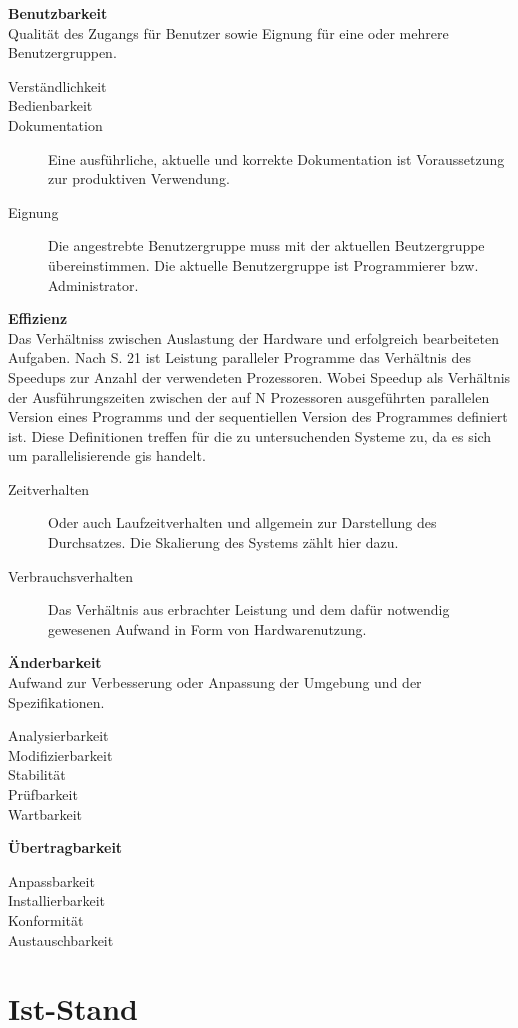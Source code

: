 \textbf{Benutzbarkeit}\\
Qualität des Zugangs für Benutzer sowie Eignung für eine oder mehrere Benutzergruppen.
\begin{description}
\item[Verständlichkeit] 
\item[Bedienbarkeit] 
\item[Dokumentation] Eine ausführliche, aktuelle und korrekte Dokumentation ist Voraussetzung zur produktiven Verwendung.
\item[Eignung] Die angestrebte Benutzergruppe muss mit der aktuellen Beutzergruppe übereinstimmen. Die aktuelle Benutzergruppe ist Programmierer bzw. Administrator.
\end{description}

\textbf{Effizienz}\\
Das Verhältniss zwischen Auslastung der Hardware und erfolgreich bearbeiteten Aufgaben. Nach \cite{book:Leistungsanalyse} S. 21 ist Leistung paralleler Programme das Verhältnis des Speedups zur Anzahl der verwendeten Prozessoren. Wobei Speedup als Verhältnis der Ausführungszeiten zwischen der auf N Prozessoren ausgeführten parallelen Version eines Programms und der sequentiellen Version des Programmes definiert ist. Diese Definitionen treffen für die zu untersuchenden Systeme zu, da es sich um parallelisierende \Gls{gis} handelt.
\begin{description}
\item[Zeitverhalten] Oder auch Laufzeitverhalten und allgemein zur Darstellung des Durchsatzes. Die Skalierung des Systems zählt hier dazu.
\item[Verbrauchsverhalten] Das Verhältnis aus erbrachter Leistung und dem dafür notwendig gewesenen Aufwand in Form von Hardwarenutzung.
\end{description}

\textbf{Änderbarkeit}\\
Aufwand zur Verbesserung oder Anpassung der Umgebung und der Spezifikationen.
\begin{description}
\item[Analysierbarkeit] 
\item[Modifizierbarkeit] 
\item[Stabilität] 
\item[Prüfbarkeit]
\item[Wartbarkeit]
\end{description}

\textbf{Übertragbarkeit}\\

\begin{description}
\item[Anpassbarkeit] 
\item[Installierbarkeit] 
\item[Konformität] 
\item[Austauschbarkeit] 
\end{description}

\section{Ist-Stand}

